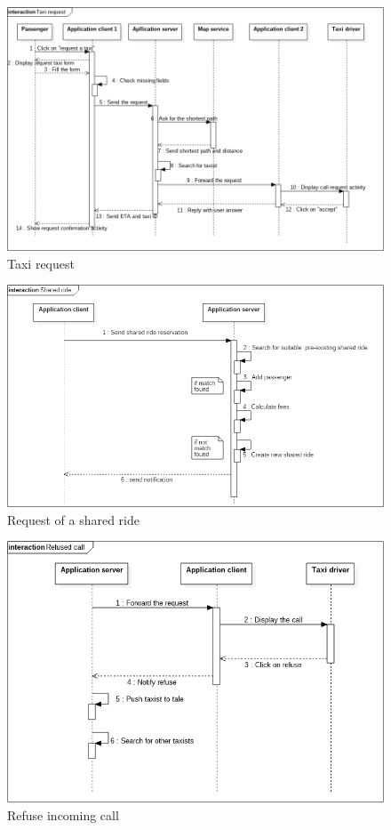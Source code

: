 \newpage
\begin{figure} [h]
\centering
\includegraphics[scale=0.5]{Sequence Diagrams/successfully_taxi_request.png}
\caption{Taxi request }
\end{figure}
\newpage
\begin{figure} [h]
\centering
\includegraphics[scale=0.5]{Sequence Diagrams/Shared_ride.png}
\caption{Request of a shared ride }
\end{figure}
\newpage
\begin{figure} [h]
\centering
\includegraphics[scale=0.5]{Sequence Diagrams/refuse_call.png}
\caption{Refuse incoming call }
\end{figure}
